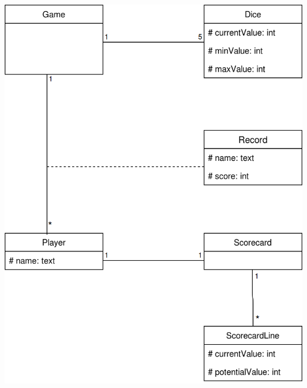 \documentclass[12pt]{article}
\begin{document}
\includegraphics[scale=.38]{diagrams/domainModel.png}

\newpage
\end{document}
